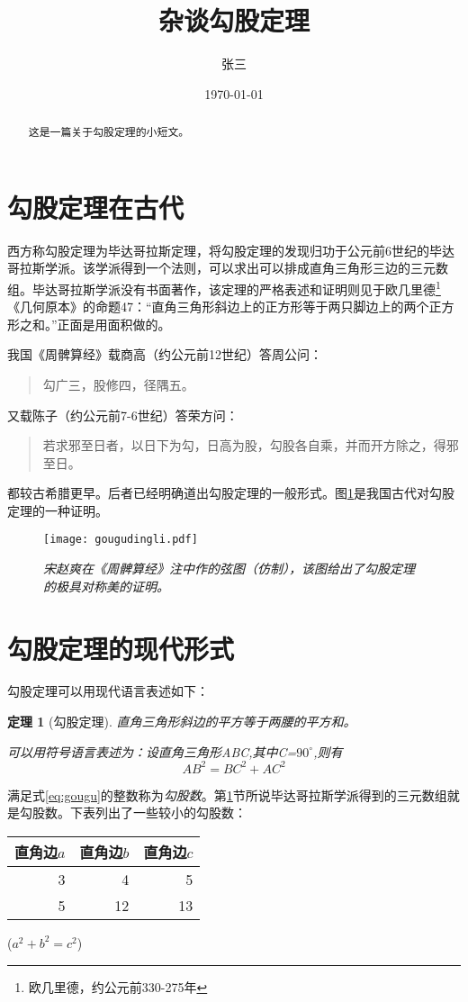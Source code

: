 \documentclass[UTF8,a6paper]{ctexart}
\title{\heiti 杂谈勾股定理}
\author{\kaishu 张三}
\date{\today}
\newtheorem{thm}{定理}
\begin{document}
\maketitle
\begin{abstract}
这是一篇关于勾股定理的小短文。
\end{abstract}
\tableofcontents
\section{勾股定理在古代}
\label{sec:ancient}
西方称勾股定理为毕达哥拉斯定理，将勾股定理的发现归功于公元前6世纪的毕达哥拉斯学派\cite{Kline}。该学派得到一个法则，可以求出可以排成直角三角形三边的三元数组。毕达哥拉斯学派没有书面著作，该定理的严格表述和证明则见于欧几里德\footnote{欧几里德，约公元前330-275年}《几何原本》的命题47：“直角三角形斜边上的正方形等于两只脚边上的两个正方形之和。”正面是用面积做的。\par
我国《周髀算经》载商高（约公元前12世纪）答周公问：
\begin{quote}
\kaishu 勾广三，股修四，径隅五。
\end{quote}
又载陈子（约公元前7-6世纪）答荣方问：
\begin{quote}
\kaishu 若求邪至日者，以日下为勾，日高为股，勾股各自乘，并而开方除之，得邪至日。
\end{quote}
都较古希腊更早。后者已经明确道出勾股定理的一般形式。图\ref{fig:gougudingli}是我国古代对勾股定理的一种证明\cite{quanjing}。
\begin{figure}[ht]
\centering
\texttt{[image: gougudingli.pdf]}
\caption{\small\it 宋赵爽在《周髀算经》注中作的弦图（仿制），该图给出了勾股定理的极具对称美的证明。}
\label{fig:gougudingli}
\end{figure}
\section{勾股定理的现代形式}
勾股定理可以用现代语言表述如下：
\begin{thm}[勾股定理]
直角三角形斜边的平方等于两腰的平方和。\par
可以用符号语言表述为：设直角三角形ABC,其中\angle C=$90^\circ$,则有
\begin{equation}\label{eq:gougu}
AB^2=BC^2+AC^2
\end{equation}
\end{thm}
满足式\eqref{eq:gougu}的整数称为\emph{勾股数}。第\ref{sec:ancient}节所说毕达哥拉斯学派得到的三元数组就是勾股数。下表列出了一些较小的勾股数：
\begin{table}[H]
\begin{tabular}{|rrr|}
\hline
直角边$a$  &  直角边$b$  &  直角边$c$\\
\hline
3&4&5\\
5&12&13\\\hline
\end{tabular}
\qquad
($a^2+b^2=c^2$)
\end{table}
\nocite{Shiye}

\end{document}
